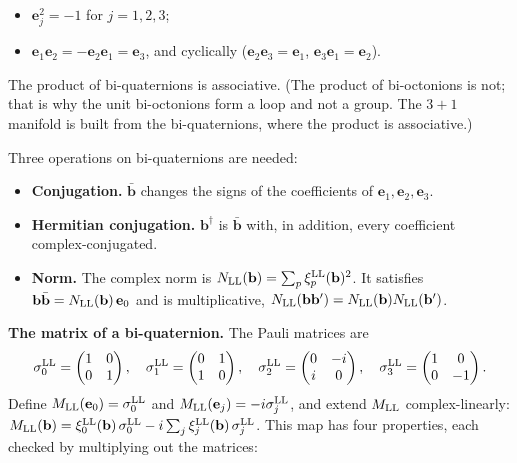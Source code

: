 \documentclass[
  10pt,
]{article}
\providecommand{\tightlist}{%
  \setlength{\itemsep}{0pt}\setlength{\parskip}{0pt}}
\begin{document}
\begin{itemize}
\tightlist
\item
  \(\mathbf e_j^2=-1\) for \(j=1,2,3\);
\item
  \(\mathbf e_1\mathbf e_2=-\mathbf e_2\mathbf e_1=\mathbf e_3\), and
  cyclically (\(\mathbf e_2\mathbf e_3=\mathbf e_1\),
  \(\mathbf e_3\mathbf e_1=\mathbf e_2\)).
\end{itemize}

The product of bi-quaternions is associative. (The product of
bi-octonions is not; that is why the unit bi-octonions form a loop and
not a group. The \(3+1\) manifold is built from the bi-quaternions,
where the product is associative.)

Three operations on bi-quaternions are needed:

\begin{itemize}
\tightlist
\item
  \textbf{Conjugation.} \(\bar{\mathbf b}\) changes the signs of the
  coefficients of \(\mathbf e_1,\mathbf e_2,\mathbf e_3\).
\item
  \textbf{Hermitian conjugation.} \(\mathbf b^\dagger\) is
  \(\bar{\mathbf b}\) with, in addition, every coefficient
  complex-conjugated.
\item
  \textbf{Norm.} The complex norm is
  \(N_{\rm LL}(\mathbf b)=\sum_p\xi^{\rm LL}_p(\mathbf b)^2\). It
  satisfies
  \(\mathbf b\bar{\mathbf b}=N_{\rm LL}(\mathbf b)\,\mathbf e_0\) and is
  multiplicative,
  \(N_{\rm LL}(\mathbf b\mathbf b')=N_{\rm LL}(\mathbf b)N_{\rm LL}(\mathbf b')\).
\end{itemize}

\textbf{The matrix of a bi-quaternion.} The Pauli matrices are
\[\sigma^{\rm LL}_0=\begin{pmatrix}1&0\\0&1\end{pmatrix},\quad\sigma^{\rm LL}_1=\begin{pmatrix}0&1\\1&0\end{pmatrix},\quad\sigma^{\rm LL}_2=\begin{pmatrix}0&-i\\i&0\end{pmatrix},\quad\sigma^{\rm LL}_3=\begin{pmatrix}1&0\\0&-1\end{pmatrix}.\]
Define \(M_{\rm LL}(\mathbf e_0)=\sigma^{\rm LL}_0\) and
\(M_{\rm LL}(\mathbf e_j)=-i\sigma^{\rm LL}_j\), and extend
\(M_{\rm LL}\) complex-linearly:
\(M_{\rm LL}(\mathbf b)=\xi^{\rm LL}_0(\mathbf b)\,\sigma^{\rm LL}_0-i\sum_j\xi^{\rm LL}_j(\mathbf b)\,\sigma^{\rm LL}_j\).
This map has four properties, each checked by multiplying out the
matrices:
\end{document}
